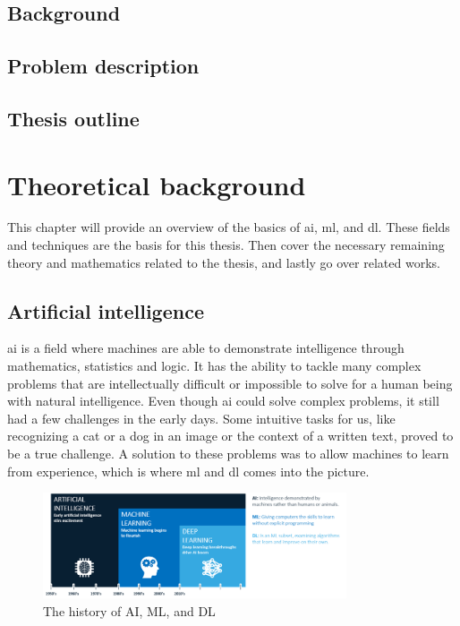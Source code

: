 \documentclass[USenglish]{ifimaster}  %
\begin{document}
\section{Background}
\section{Problem description}
\section{Thesis outline}

\chapter{Theoretical background}
This chapter will provide an overview of the basics of \ac{ai}, \ac{ml}, and \ac{dl}. These fields and techniques are the basis for this thesis. Then cover the necessary remaining theory and mathematics related to the thesis, and lastly go over related works.
\section{Artificial intelligence}
\ac{ai} is a field where machines are able to demonstrate intelligence through mathematics, statistics and logic. It has the ability to tackle many complex problems that are intellectually difficult or impossible to solve for a human being with natural intelligence. Even though \ac{ai} could solve complex problems, it still had a few challenges in the early days. Some intuitive tasks for us, like recognizing a cat or a dog in an image or the context of a written text, proved to be a true challenge. A solution to these problems was to allow machines to learn from experience, which is where \ac{ml} and \ac{dl} comes into the picture\cite{The_holy_grail_of_DL}.
\begin{figure}[ht]
    \centering
    \includegraphics[width=0.8\textwidth]{bilder/AI_ML_DL.png}
    \caption{The history of AI, ML, and DL
    \protect\cite{website:AI}}
    \label{fig:AI}
\end{figure}
\end{document}
